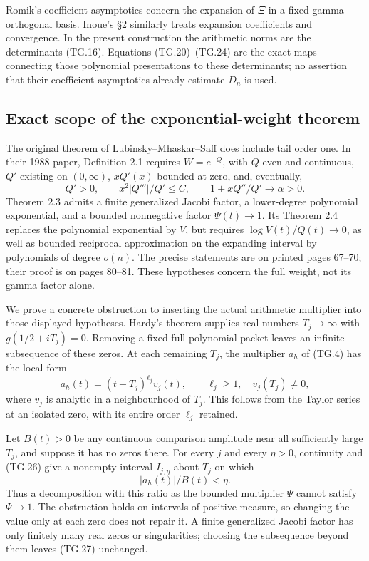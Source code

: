 Romik's coefficient asymptotics concern the expansion of \(\Xi\)
in a fixed gamma-orthogonal basis.  Inoue's \S2 similarly treats
expansion coefficients and convergence.  In the present construction
the arithmetic norms are the determinants (TG.16).  Equations
(TG.20)--(TG.24) are the exact maps connecting those polynomial
presentations to these determinants; no assertion that their
coefficient asymptotics already estimate \(D_n\) is used.

\subsection{Exact scope of the exponential-weight theorem}

The original theorem of Lubinsky--Mhaskar--Saff does include tail
order one.  In their 1988 paper, Definition 2.1 requires
\(W=e^{-Q}\), with \(Q\) even and continuous, \(Q'\) existing
on \((0,\infty)\), \(xQ'(x)\) bounded at zero, and, eventually,
\[
 Q'>0,\qquad x^2|Q'''|/Q'\leq C,\qquad
            1+xQ''/Q'\longrightarrow\alpha>0.
                                                               \tag{TG.25}
\]
Theorem 2.3 admits a finite generalized Jacobi factor, a lower-degree
polynomial exponential, and a bounded nonnegative factor
\(\Psi(t)\to1\).  Its Theorem 2.4 replaces the polynomial
exponential by \(V\), but requires
\(\log V(t)/Q(t)\to0\), as well as bounded reciprocal
approximation on the expanding interval by polynomials of degree
\(o(n)\).  The precise statements are on printed pages 67--70;
their proof is on pages 80--81.  These hypotheses concern the
full weight, not its gamma factor alone.

We prove a concrete obstruction to inserting the actual arithmetic
multiplier into those displayed hypotheses.  Hardy's theorem
supplies real numbers \(T_j\to\infty\) with
\(g(1/2+iT_j)=0\).  Removing a fixed full polynomial packet
leaves an infinite subsequence of these zeros.  At each remaining
\(T_j\), the multiplier \(a_h\) of (TG.4) has the local form
\[
 a_h(t)=(t-T_j)^{\ell_j}v_j(t),\qquad
 \ell_j\geq1,\quad v_j(T_j)\ne0,
                                                               \tag{TG.26}
\]
where \(v_j\) is analytic in a neighbourhood of \(T_j\).
This follows from the Taylor series at an isolated zero, with its
entire order \(\ell_j\) retained.

Let \(B(t)>0\) be any continuous comparison amplitude near all
sufficiently large \(T_j\), and suppose it has no zeros there.
For every \(j\) and every \(\eta>0\), continuity and (TG.26)
give a nonempty interval \(I_{j,\eta}\) about \(T_j\) on which
\[
                 |a_h(t)|/B(t)<\eta.
                                                               \tag{TG.27}
\]
Thus a decomposition with this ratio as the bounded multiplier
\(\Psi\) cannot satisfy \(\Psi\to1\).  The obstruction
holds on intervals of positive measure, so changing the value only
at each zero does not repair it.  A finite generalized Jacobi
factor has only finitely many real zeros or singularities; choosing
the subsequence beyond them leaves (TG.27) unchanged.

